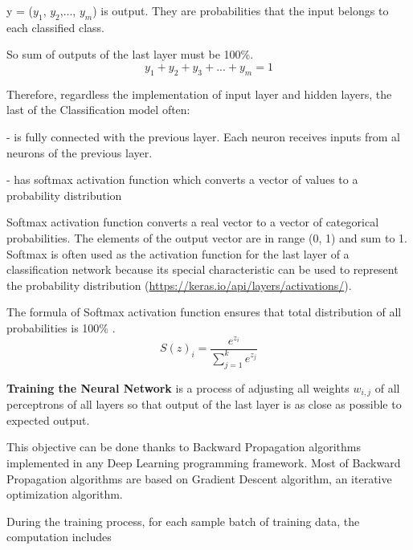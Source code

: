 y = ($y_{1}$, $y_{2}$,..., $y_{m}$) is output. They are probabilities that the input belongs to each classified class. 

So sum of outputs of the last layer must be 100\%.
\[ y_{1} + y_{2} + y_{3} + ... + y_{m} = 1 \]

Therefore, regardless the implementation of input layer and hidden layers, the last of the Classification model often:

- is fully connected with the previous layer. Each neuron receives inputs from al neurons of the previous layer.

- has softmax activation function which converts a vector of values to a probability distribution

Softmax activation function converts a real vector to a vector of categorical probabilities. The elements of the output vector are in range (0, 1) and sum to 1. Softmax is often used as the activation function for the last layer of a classification network because its special characteristic can be used to represent the probability distribution  (\url{https://keras.io/api/layers/activations/}).


The formula of Softmax activation function ensures that total distribution of all probabilities is 100\% \parencite{michelucci2018applied}.
\[
S(z)_{i} = \frac { e^{z_{i}} } { \sum_{j=1}^{k} e^{z_{j} } }
\]


\textbf{Training the Neural Network} is a process of adjusting all weights $w_{i,j}$ of all perceptrons of all layers so that output of the last layer is as close as possible to expected output.

This objective can be done thanks to Backward Propagation algorithms implemented in any Deep Learning programming framework. Most of Backward Propagation algorithms are based on Gradient Descent algorithm, an iterative optimization algorithm.

During the training process, for each sample batch of training data, the computation includes

